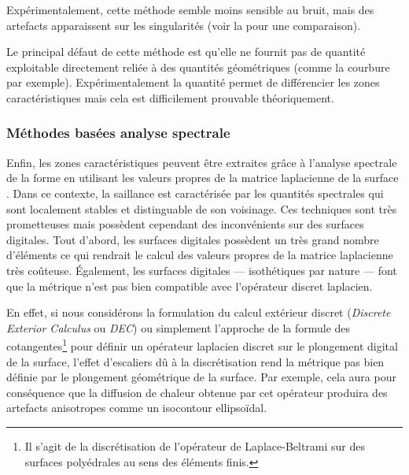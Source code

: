 Expérimentalement, cette méthode semble moins sensible au bruit, mais des
artefacts apparaissent sur les singularités (voir la 
pour une comparaison).

Le principal défaut de cette méthode est qu'elle ne fournit pas de quantité
exploitable directement reliée à des quantités géométriques (comme la courbure
par exemple). Expérimentalement la quantité permet de différencier les zones
caractéristiques mais cela est difficilement prouvable théoriquement.

\subsubsection{Méthodes basées analyse spectrale}
\label{sec:applications:feature:spectral}

Enfin, les zones caractéristiques peuvent être extraites grâce à l'analyse
spectrale de la forme en utilisant les valeurs propres de la matrice laplacienne
de la surface \cite{GebalBAL09,Sun2009,Song2014}. Dans ce contexte, la saillance
est caractérisée par les quantités spectrales qui sont localement stables et
distinguable de son voisinage. Ces techniques sont très prometteuses mais
possèdent cependant des inconvénients sur des surfaces digitales. Tout d'abord,
les surfaces digitales possèdent un très grand nombre d'éléments ce qui rendrait
le calcul des valeurs propres de la matrice laplacienne très coûteuse.
Également, les surfaces digitales --- isothétiques par nature --- font que la
métrique n'est pas bien compatible avec l'opérateur discret laplacien.

En effet, si nous considérons la formulation du calcul extérieur discret
(\emph{Discrete Exterior Calculus} ou \emph{DEC}) ou simplement l'approche de la
formule des cotangentes\footnote{Il s'agit de la discrétisation de l'opérateur de
Laplace-Beltrami sur des surfaces polyédrales au sens des éléments finis.} pour
définir un opérateur laplacien discret sur le plongement digital de la surface,
l'effet d'escaliers dû à la discrétisation rend la métrique pas bien définie par
le plongement géométrique de la surface. Par exemple, cela aura pour conséquence
que la diffusion de chaleur obtenue par cet opérateur produira des artefacts
anisotropes comme un isocontour ellipsoïdal.

